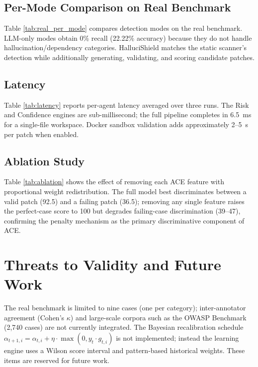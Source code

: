\documentclass[conference]{IEEEtran}
\begin{document}
\subsection{Per-Mode Comparison on Real Benchmark}
Table \ref{tab:real_per_mode} compares detection modes on the real benchmark.
LLM-only modes obtain 0\% recall (22.22\% accuracy) because they do not
handle hallucination/dependency categories. HalluciShield matches the static
scanner's detection while additionally generating, validating, and scoring
candidate patches.

\subsection{Latency}
Table \ref{tab:latency} reports per-agent latency averaged over three runs.
The Risk and Confidence engines are sub-millisecond; the full pipeline
completes in 6.5~ms for a single-file workspace. Docker sandbox validation
adds approximately 2--5~s per patch when enabled.

\subsection{Ablation Study}
Table \ref{tab:ablation} shows the effect of removing each ACE feature with
proportional weight redistribution. The full model best discriminates between
a valid patch (92.5) and a failing patch (36.5); removing any single feature
raises the perfect-case score to 100 but degrades failing-case
discrimination (39--47), confirming the penalty mechanism as the primary
discriminative component of ACE.

\section{Threats to Validity and Future Work}
\label{sec:threats}
The real benchmark is limited to nine cases (one per category);
inter-annotator agreement (Cohen's $\kappa$) and large-scale corpora such as
the OWASP Benchmark (2{,}740 cases) are not currently integrated. The
Bayesian recalibration schedule $\alpha_{t+1,i} = \alpha_{t,i} + \eta \cdot
\max(0, y_t \cdot g_{t,i})$ is not implemented; instead the learning engine
uses a Wilson score interval and pattern-based historical weights. These
items are reserved for future work.
\end{document}
